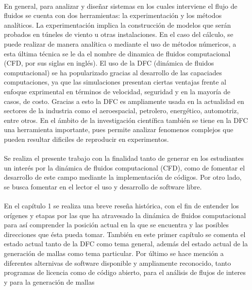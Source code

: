 \documentclass[letterpaper, openright, 12pt]{book}
\begin{document}
	\paragraph*{}
    En general, para analizar y diseñar sistemas en los cuales interviene el
    flujo de fluidos se cuenta con dos herramientas: la experimentación y los
    métodos analíticos. La experimentación implica la construcción de modelos
    que serán probados en túneles de viento u otras instalaciones. En el caso
    del cálculo, se puede realizar de manera analítica o mediante el uso de
    métodos númericos, a esta última técnica se le da el nombre de dinamica de
    fluidos computacional (CFD, por sus siglas en inglés). El uso de la DFC
    (dinámica de fluidos computacional) se ha popularizado gracias al
    desarrollo de las capaciades computaciones, ya que las simulaciones
    presentan ciertas ventajas frente al enfoque exprimental en términos de
    velocidad, seguridad y en la mayoría de casos, de costo. Gracias a esto la
    DFC es ampliamente usada en la actualidad en sectores de la industria como
    el aeroespacial, petrolero, energético, automotriz, entre otros. En el
    ámbito de la investigación científica también se tiene en la DFC una
    herramienta importante, pues permite analizar fenomenos complejos que
    pueden resultar dificiles de reproducir en experimentos.

    \paragraph*{}
    Se realiza el presente trabajo con la finalidad tanto de generar en los
    estudiantes un interés por la dinámica de fluidos computacional (CFD), como
    de fomentar el desarrollo de este campo mediante la implementación de
    códigos. Por otro lado, se busca fomentar en el lector el uso y desarrollo
    de software libre.

    \paragraph*{}
    En el capítulo 1 se realiza una breve reseña histórica, con el fin de
    entender los orígenes y etapas por las que ha atravesado la dinámica de
    fluidos computacional para así comprender la posición actual en la que se
    encuentra y las posibles direcciones que ésta pueda tomar. También en este
    primer capítulo se comenta el estado actual tanto de la DFC como tema
    general, además del estado actual de la generación de mallas como tema
    particular. Por último se hace mención a diferentes alternivas de software
    disponible y ampliamente reconocido, tanto programas de licencia como de
    código abierto, para el análisis de flujos de interes y para la generación
    de mallas
\end{document}
